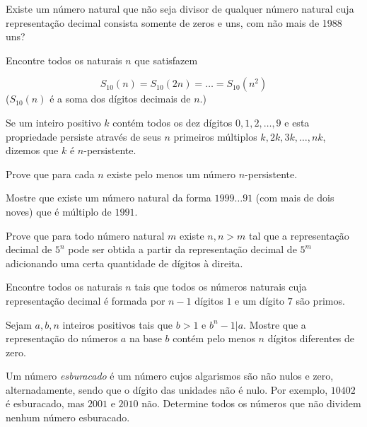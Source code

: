 \begin{questao}
  Existe um número natural que não seja divisor de qualquer número natural cuja
  representação decimal consista somente de zeros e uns, com não mais de 1988
  uns?
\end{questao}

\begin{questao}
  Encontre todos os naturais $n$ que satisfazem

  $$ S_{10}(n) = S_{10}(2n) = \ldots = S_{10}(n^2) $$
  ($S_{10}(n)$ é a soma dos dígitos decimais de $n$.)
\end{questao}

\begin{questao}
  Se um inteiro positivo $k$ contém todos os dez dígitos
  $0,1,2,\ldots,9$ e esta propriedade persiste através de seus
  $n$ primeiros múltiplos $k,2k,3k,\ldots,nk$, dizemos que $k$ é
  $n$-persistente.

  Prove que para cada $n$ existe pelo menos um número
  $n$-persistente.
\end{questao}

\begin{questao}
  Mostre que existe um número natural da forma $1999\ldots
  91$ (com mais de dois noves) que é múltiplo de $1991$.
\end{questao}

\begin{questao}
  Prove que para todo número natural $m$ existe $n, n>m$
  tal que a representação decimal de $5^n$ pode ser obtida a partir
  da representação decimal de $5^m$ adicionando uma certa quantidade
  de dígitos à direita.
\end{questao}

\begin{questao}
  Encontre todos os naturais $n$ tais que todos os números
  naturais cuja representação decimal é formada por $n-1$ dígitos
  $1$ e um dígito $7$ são primos.

\end{questao}

\begin{questao}
  Sejam $a,b,n$ inteiros positivos tais que $b>1$ e
  $b^n-1|a$. Mostre que a representação do números $a$ na base
  $b$ contém pelo menos $n$ dígitos diferentes de zero.

\end{questao}

\begin{questao}
  Um número {\it esburacado} é um número cujos algarismos são não
  nulos e zero, alternadamente, sendo que o dígito das unidades não é
  nulo. Por exemplo, $10402$ é esburacado, mas $2001$ e $2010$
  não. Determine todos os números que não dividem nenhum número
  esburacado.
\end{questao}

